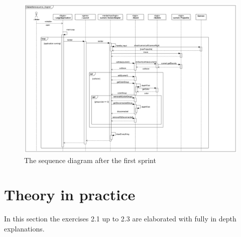 \documentclass[a4paper,11pt]{article}
\begin{document}
\subsection{}
\begin{figure}[h]
\includegraphics[width=\textwidth]{old_sequence_diagram}
\caption{The sequence diagram after the first sprint}
\end{figure}
\section{Theory in practice \\}

In this section the exercises 2.1 up to 2.3 are elaborated with fully in depth explanations. \\

\end{document}
